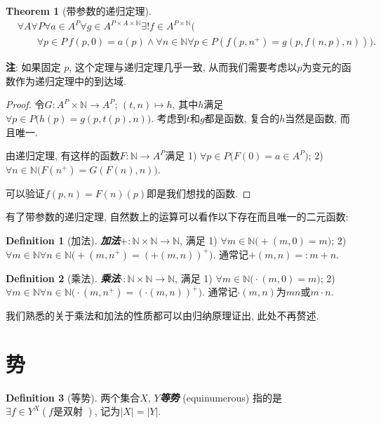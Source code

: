 \documentclass[openany]{ctexbook}
\newcommand*{\indexbf}[1]{\emph{\textbf{#1}}\index{#1}} %
\theoremstyle{plain}
\newtheorem{theorem}{Theorem}[section] %
\theoremstyle{definition}
\newtheorem{definition}{Definition}[section] %
\begin{document}
\begin{theorem}[带参数的递归定理] 
\begin{align*}
&
	\forall A \forall P \forall a \in A^P
	\forall g \in A^{P \times A \times \mathbb N}
	\exists ! f\in A^{P \times \mathbb N}\big(
\\ &\qquad
		\forall p \in P\,
			f(p, 0) = a(p) \wedge \forall n \in \mathbb N \forall p \in P(
			f(p, n^+) = g(p, f(n, p), n))\big).
\end{align*}

\end{theorem}
\textbf{注}: 如果固定 $p$, 这个定理与递归定理几乎一致, 从而我们需要考虑以$p$为变元的函数作为递归定理中的到达域.
\begin{proof}
令$G\colon A^P\times \mathbb N \to A^P$; $(t,n) \mapsto h$, 其中$h$满足$\forall p\in P \big(
	h(p) = g(p,t(p),n)\big)$. 
考虑到$t$和$g$都是函数, 复合的$h$当然是函数, 而且唯一.

由递归定理, 有这样的函数$F \colon \mathbb N \to A^P$满足 
1) $\forall p\in P\big(
	F(0)=a\in A^P\big)$; 
2) $\forall n\in \mathbb N\big(
	F(n^+) = G(F(n), n)\big)$. 

可以验证$f(p,n) = F(n)(p)$即是我们想找的函数.
\end{proof}

有了带参数的递归定理, 自然数上的运算可以看作以下存在而且唯一的二元函数:

\begin{definition}[加法]
\indexbf{加法}$+ \colon \mathbb N\times \mathbb N \to \mathbb N$, 满足
1) $\forall m\in \mathbb N \big( 
	+(m,0)=m\big)$;
2) $\forall m\in\mathbb N\forall n\in \mathbb N \big(
	+(m,n^+)=(+(m,n))^+\big)$. 通常记$+(m,n) =: m+n$.
\end{definition}

\begin{definition}[乘法]
\indexbf{乘法}$\cdot \colon \mathbb N\times \mathbb N \to \mathbb N$, 满足
1) $\forall m\in \mathbb N \big( 
	\cdot(m,0)=m\big)$;
2) $\forall m\in\mathbb N\forall n\in \mathbb N \big(
	\cdot(m,n^+)=(\cdot(m,n))^+\big)$. 通常记$\cdot(m,n) $为$mn$或$m\cdot n$.
\end{definition}

我们熟悉的关于乘法和加法的性质都可以由归纳原理证出, 此处不再赘述.

\section{势}

\begin{definition}[等势]\label{definition:equinumerosity}
两个集合$X$, $Y$\indexbf{等势} (equinumerous) 指的是$\exists f \in Y^X (f\text{是双射 })$, 记为$|X|=|Y|$.
\end{definition}
\end{document}
